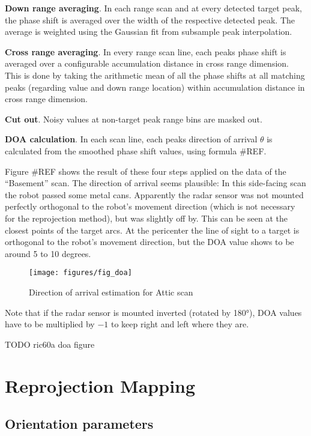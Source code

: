 \textbf{Down range averaging}. In each range scan and at every
detected target peak, the phase shift is averaged over the width of the
respective detected peak. The average is weighted using the Gaussian fit
from subsample peak interpolation.

\textbf{Cross range averaging}. In
every range scan line, each peaks phase shift is averaged over a
configurable accumulation distance in cross range dimension. This is
done by taking the arithmetic mean of all the phase shifts at all
matching peaks (regarding value and down range location) within
accumulation distance in cross range dimension.

\textbf{Cut out}. Noisy
values at non-target peak range bins are masked out.

\textbf{DOA
calculation}. In each scan line, each peaks direction of arrival
\(\theta\) is calculated from the smoothed phase shift values, using
formula \#REF.

Figure \#REF shows the result of these four steps applied on the data of
the ``Basement'' scan. The direction of arrival seems plausible: In this
side-facing scan the robot passed some metal cans. Apparently the radar
sensor was not mounted perfectly orthogonal to the robot's movement
direction (which is not necessary for the reprojection method), but was
slightly off by. This can be seen at the closest points of the target
arcs. At the pericenter the line of sight to a target is orthogonal to
the robot's movement direction, but the DOA value shows to be around 5
to 10 degrees.

\begin{figure}[htp]
    \centering
    \label{fig:fig_doa}
    \texttt{[image: figures/fig\_doa]}
    \caption{Direction of arrival estimation for Attic scan}
\end{figure}

Note that if the radar sensor is mounted inverted (rotated by 180°), DOA
values have to be multiplied by \(-1\) to keep right and left where they
are.

TODO ric60a doa figure

\section{Reprojection Mapping}\label{reprojection-mapping}

\subsection{Orientation parameters}\label{orientation-parameters}

